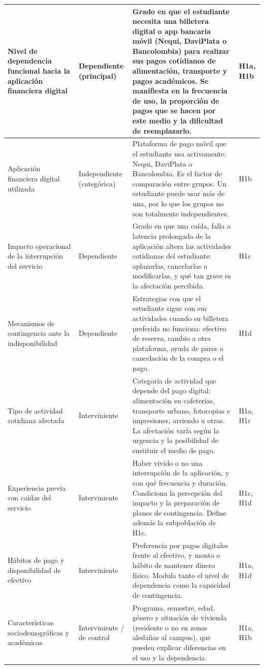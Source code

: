 \begin{longtable}{|p{3.5cm}|p{2.5cm}|p{6.5cm}|p{1.5cm}|}
Nivel de dependencia funcional hacia la aplicación financiera digital & Dependiente (principal) & Grado en que el estudiante necesita una billetera digital o app bancaria móvil (Nequi, DaviPlata o Bancolombia) para realizar sus pagos cotidianos de alimentación, transporte y pagos académicos. Se manifiesta en la frecuencia de uso, la proporción de pagos que se hacen por este medio y la dificultad de reemplazarlo. & H1a, H1b \\ \hline
Aplicación financiera digital utilizada & Independiente (categórica) & Plataforma de pago móvil que el estudiante usa activamente: Nequi, DaviPlata o Bancolombia. Es el factor de comparación entre grupos. Un estudiante puede usar más de una, por lo que los grupos no son totalmente independientes. & H1b \\ \hline
Impacto operacional de la interrupción del servicio & Dependiente & Grado en que una caída, falla o latencia prolongada de la aplicación altera las actividades cotidianas del estudiante: aplazarlas, cancelarlas o modificarlas, y qué tan grave es la afectación percibida. & H1c \\ \hline
Mecanismos de contingencia ante la indisponibilidad & Dependiente & Estrategias con que el estudiante sigue con sus actividades cuando su billetera preferida no funciona: efectivo de reserva, cambio a otra plataforma, ayuda de pares o cancelación de la compra o el pago. & H1d \\ \hline
Tipo de actividad cotidiana afectada & Interviniente & Categoría de actividad que depende del pago digital: alimentación en cafeterías, transporte urbano, fotocopias e impresiones, arriendo u otras. La afectación varía según la urgencia y la posibilidad de sustituir el medio de pago. & H1a, H1c \\ \hline
Experiencia previa con caídas del servicio & Interviniente & Haber vivido o no una interrupción de la aplicación, y con qué frecuencia y duración. Condiciona la percepción del impacto y la preparación de planes de contingencia. Define además la subpoblación de H1c. & H1c, H1d \\ \hline
Hábitos de pago y disponibilidad de efectivo & Interviniente & Preferencia por pagos digitales frente al efectivo, y monto o hábito de mantener dinero físico. Modula tanto el nivel de dependencia como la capacidad de contingencia. & H1a, H1d \\ \hline
Características sociodemográficas y académicas & Interviniente / de control & Programa, semestre, edad, género y situación de vivienda (residente o no en zonas aledañas al campus), que pueden explicar diferencias en el uso y la dependencia. & H1a, H1b \\ \hline
\end{longtable}
\endgroup